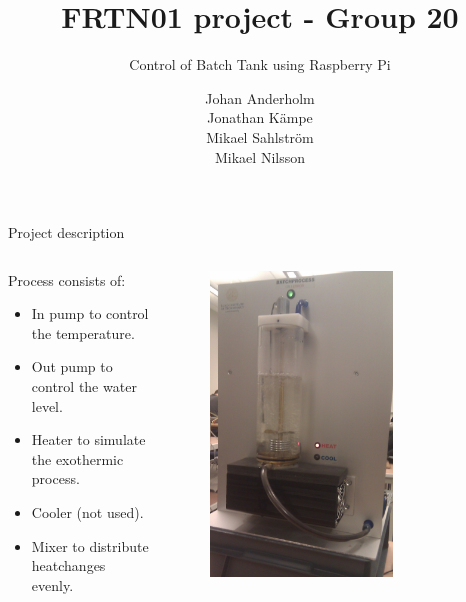 \documentclass{beamer}
\begin{document}
\title{FRTN01 project - Group 20}
\subtitle{Control of Batch Tank using Raspberry Pi}
\author{Johan Anderholm \\ Jonathan Kämpe \\ Mikael Sahlström \\ Mikael Nilsson}

\begin{frame}[plain]
  \titlepage
\end{frame}

\begin{frame}{Project description}
\begin{columns}[T]
    \begin{column}{.55\textwidth}
        Process consists of:
        \begin{itemize}
            \item In pump to control the temperature.
            \item Out pump to control the water level.
            \item Heater to simulate the exothermic process.
            \item Cooler (not used).
            \item Mixer to distribute heatchanges evenly.
        \end{itemize}
    \end{column}
    \begin{column}{.45\textwidth}

        \begin{figure}[H]
           \centering
           \includegraphics[width=0.7\textwidth]{batchprocess.jpg}
        \end{figure}


\end{column}
\end{columns}
\end{frame}
\end{document}
